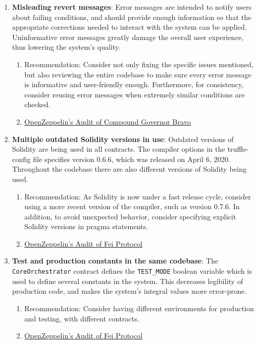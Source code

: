 \begin{enumerate}
\item\textbf{Misleading revert messages}: Error messages are intended to notify users about failing conditions, and should provide enough information so that the appropriate corrections needed to interact with the system can be applied. Uninformative error messages greatly damage the overall user experience, thus lowering the system’s quality.
	\begin{enumerate}
	\item Recommendation: Consider not only fixing the specific issues mentioned, but also reviewing the entire codebase to make sure every error message is informative and user-friendly enough. Furthermore, for consistency, consider reusing error messages when extremely similar conditions are checked.
	\item\href{https://blog.openzeppelin.com/compound-governor-bravo-audit/}{OpenZeppelin's Audit of Compound Governor Bravo}
	\end{enumerate}

\item\textbf{Multiple outdated Solidity versions in use}: Outdated versions of Solidity are being used in all contracts. The compiler options in the truffle-config file specifies version 0.6.6, which was released on April 6, 2020. Throughout the codebase there are also different versions of Solidity being used.
	\begin{enumerate}
	\item Recommendation: As Solidity is now under a fast release cycle, consider using a more recent version of the compiler, such as version 0.7.6. In addition, to avoid unexpected behavior, consider specifying explicit Solidity versions in pragma statements.
	\item\href{https://blog.openzeppelin.com/fei-protocol-audit/}{OpenZeppelin's Audit of Fei Protocol}
	\end{enumerate}

\item\textbf{Test and production constants in the same codebase}: The \verb|CoreOrchestrator| contract defines the \verb|TEST_MODE| boolean variable which is used to define several constants in the system. This decreases legibility of production code, and makes the system’s integral values more error-prone.
	\begin{enumerate}
	\item Recommendation: Consider having different environments for production and testing, with different contracts.
	\item\href{https://blog.openzeppelin.com/fei-protocol-audit/}{OpenZeppelin's Audit of Fei Protocol}
	\end{enumerate}


\end{enumerate}

